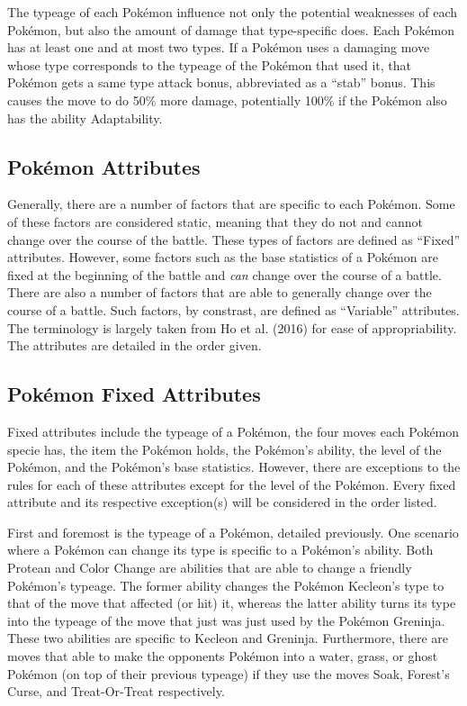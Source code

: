 \documentclass[12pt,twoside]{reedthesis}
\begin{document}
  The typeage of each Pokémon influence not only the potential weaknesses
  of each Pokémon, but also the amount of damage that type-specific does.
  Each Pokémon has at least one and at most two types. If a Pokémon uses a
  damaging move whose type corresponds to the typeage of the Pokémon that
  used it, that Pokémon gets a same type attack bonus, abbreviated as a
  ``stab'' bonus. This causes the move to do 50\% more damage, potentially
  100\% if the Pokémon also has the ability Adaptability.
  
  \subsection{Pokémon Attributes}\label{pokemon-attributes}
  
  Generally, there are a number of factors that are specific to each
  Pokémon. Some of these factors are considered static, meaning that they
  do not and cannot change over the course of the battle. These types of
  factors are defined as ``Fixed'' attributes. However, some factors such
  as the base statistics of a Pokémon are fixed at the beginning of the
  battle and \emph{can} change over the course of a battle. There are also
  a number of factors that are able to generally change over the course of
  a battle. Such factors, by constrast, are defined as ``Variable''
  attributes. The terminology is largely taken from Ho et al. (2016) for
  ease of appropriability. The attributes are detailed in the order given.
  
  \subsection{Pokémon Fixed Attributes}\label{pokemon-fixed-attributes}
  
  Fixed attributes include the typeage of a Pokémon, the four moves each
  Pokémon specie has, the item the Pokémon holds, the Pokémon's ability,
  the level of the Pokémon, and the Pokémon's base statistics. However,
  there are exceptions to the rules for each of these attributes except
  for the level of the Pokémon. Every fixed attribute and its respective
  exception(s) will be considered in the order listed.
  
  First and foremost is the typeage of a Pokémon, detailed previously. One
  scenario where a Pokémon can change its type is specific to a Pokémon's
  ability. Both Protean and Color Change are abilities that are able to
  change a friendly Pokémon's typeage. The former ability changes the
  Pokémon Kecleon's type to that of the move that affected (or hit) it,
  whereas the latter ability turns its type into the typeage of the move
  that just was just used by the Pokémon Greninja. These two abilities are
  specific to Kecleon and Greninja. Furthermore, there are moves that able
  to make the opponents Pokémon into a water, grass, or ghost Pokémon (on
  top of their previous typeage) if they use the moves Soak, Forest's
  Curse, and Treat-Or-Treat respectively.
  
\end{document}
